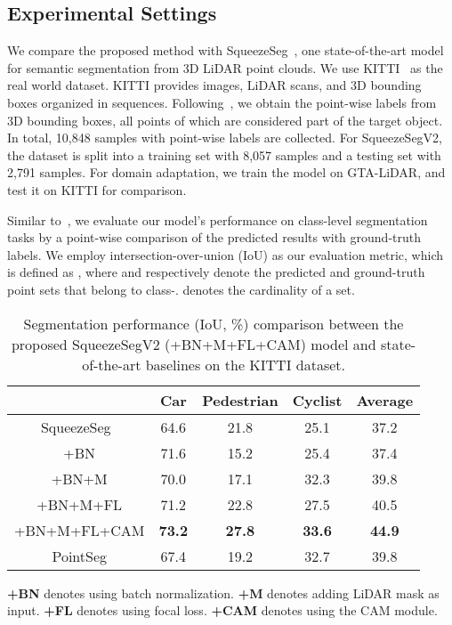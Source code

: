 \documentclass[letterpaper, 10 pt, conference]{ieeeconf}
\begin{document}
\subsection{Experimental Settings}
\label{ssec:Settings}
We compare the proposed method with SqueezeSeg~\cite{wu2017squeezeseg}, one state-of-the-art model for semantic segmentation from 3D LiDAR point clouds. We use KITTI~\cite{geiger2012we} as the real world dataset. KITTI provides images, LiDAR scans, and 3D bounding boxes organized in sequences. Following~\cite{wu2017squeezeseg}, we obtain the point-wise labels from 3D bounding boxes, all points of which are considered part of the target object. In total, 10,848 samples with point-wise labels are collected. For SqueezeSegV2, the dataset is split into a training set with 8,057 samples and a testing set with 2,791 samples. 
For domain adaptation, we train the model on GTA-LiDAR, and test it on KITTI for comparison.

Similar to~\cite{wu2017squeezeseg}, we evaluate our model's performance on class-level segmentation tasks by a point-wise comparison of the predicted results with ground-truth labels. We employ intersection-over-union (IoU) as our evaluation metric, which is defined as , where  and  respectively denote the predicted and ground-truth point sets that belong to class-.  denotes the cardinality of a set. 

\begin{table}[!t]
\begin{center}

\caption{Segmentation performance (IoU, \%) comparison between the proposed SqueezeSegV2 (+BN+M+FL+CAM) model and state-of-the-art baselines on the KITTI dataset. }\begin{tabular}
{c | c c c c}
\hline
& Car & Pedestrian & Cyclist & Average\\
\hline
SqueezeSeg~\cite{wu2017squeezeseg} & 64.6 & 21.8  &  25.1  & 37.2 \\
+BN & 71.6  & 15.2  & 25.4 & 37.4 \\
+BN+M  & 70.0  & 17.1 & 32.3 & 39.8\\
+BN+M+FL   & 71.2 & 22.8  &  27.5 & 40.5 \\
+BN+M+FL+CAM & \textbf{73.2} & \textbf{27.8} & \textbf{33.6} & \textbf{44.9} \\
\hline
PointSeg \cite{wang2018pointseg} & 67.4 & 19.2 & 32.7 & 39.8 \\
\hline
\end{tabular}
\label{tab:SqueezeSegV2}
\end{center}
\textbf{+BN} denotes using batch normalization. \textbf{+M} denotes adding LiDAR mask as input. \textbf{+FL} denotes using focal loss. \textbf{+CAM} denotes using the CAM module.
\end{table}
\end{document}
